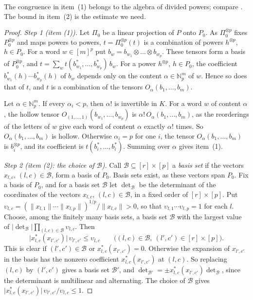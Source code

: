 \documentclass[11pt]{amsart}
\theoremstyle{definition}
\theoremstyle{remark}
\numberwithin{equation}{section}
\newcommand{\N}{\mathbb N}
\newcommand{\abs}[1]{\lvert #1\rvert}
\newcommand{\norm}[1]{\lVert #1\rVert}
\theoremstyle{plain}
\theoremstyle{definition}
\theoremstyle{plain}
\begin{document}
The congruence in item~(1) belongs to the algebra of divided powers; compare \cite[Th.~IV.2, Prop.~III.1 and App.~I, Props.~1,~2]{Ro}. The bound in item~(2) is the estimate we need.

\begin{proof}
\emph{Step 1 (item (1)).} Let $\Pi_0$ be a linear projection of $P$ onto $P_0$. As $\Pi_0^{\otimes p}$ fixes $P_0^{\otimes p}$ and maps powers to powers, $t=\Pi_0^{\otimes p}(t)$ is a combination of powers $h^{\otimes p}$, $h\in P_0$. For a word $w\in[m]^p$ put $b_w=b_{w_1}\otimes\dots\otimes b_{w_p}$. These tensors form a basis of $P_0^{\otimes p}$, and $t=\sum_wt(b_{w_1}^*,\dots,b_{w_p}^*)\,b_w$. For a power $h^{\otimes p}$, $h\in P_0$, the coefficient $b_{w_1}^*(h)\cdots b_{w_p}^*(h)$ of $b_w$ depends only on the content $\alpha\in\N^m_p$ of $w$. Hence so does that of $t$, and $t$ is a combination of the tensors $O_\alpha(b_1,\dots,b_m)$.

Let $\alpha\in\N^m_p$. If every $\alpha_i<p$, then $\alpha!$ is invertible in $K$. For a word $w$ of content $\alpha$, the hollow tensor $O_{(1,\dots,1)}(b_{w_1},\dots,b_{w_p})$ is $\alpha!\,O_\alpha(b_1,\dots,b_m)$, as the reorderings of the letters of $w$ give each word of content $\alpha$ exactly $\alpha!$ times. So $O_\alpha(b_1,\dots,b_m)$ is hollow. Otherwise $\alpha_i=p$ for one $i$, the tensor $O_\alpha(b_1,\dots,b_m)$ is $b_i^{\otimes p}$, and its coefficient is $t(b_i^*,\dots,b_i^*)$. Summing over $\alpha$ gives item~(1).

\emph{Step 2 (item (2): the choice of $\mathcal B$).} Call $\mathcal B\subseteq[r]\times[p]$ a \emph{basis set} if the vectors $x_{l,c}$, $(l,c)\in\mathcal B$, form a basis of $P_0$. Basis sets exist, as these vectors span $P_0$. Fix a basis of $P_0$, and for a basis set $\mathcal B$ let $\det_{\mathcal B}$ be the determinant of the coordinates of the vectors $x_{l,c}$, $(l,c)\in\mathcal B$, in a fixed order of $[r]\times[p]$. Put $\upsilon_{l,c}=(\norm{x_{l,1}}\cdots\norm{x_{l,p}})^{1/p}/\norm{x_{l,c}}>0$, so that $\upsilon_{l,1}\cdots\upsilon_{l,p}=1$ for each $l$. Choose, among the finitely many basis sets, a basis set $\mathcal B$ with the largest value of $\abs{\det_{\mathcal B}}\prod_{(l,c)\in\mathcal B}\upsilon_{l,c}$. Then
\begin{equation}\label{dp:eq:exchange}
 \abs{x_{l,c}^*(x_{l',c'})}\,\upsilon_{l',c'}\le\upsilon_{l,c}\qquad
 \bigl((l,c)\in\mathcal B,\ (l',c')\in[r]\times[p]\bigr).
\end{equation}
This is clear if $(l',c')\in\mathcal B$ or $x_{l,c}^*(x_{l',c'})=0$. Otherwise the expansion of $x_{l',c'}$ in the basis has the nonzero coefficient $x_{l,c}^*(x_{l',c'})$ at $(l,c)$. So replacing $(l,c)$ by $(l',c')$ gives a basis set $\mathcal B'$, and $\det_{\mathcal B'}=\pm x_{l,c}^*(x_{l',c'})\det_{\mathcal B}$, since the determinant is multilinear and alternating. The choice of $\mathcal B$ gives $\abs{x_{l,c}^*(x_{l',c'})}\,\upsilon_{l',c'}/\upsilon_{l,c}\le1$.


\end{proof}
\end{document}
